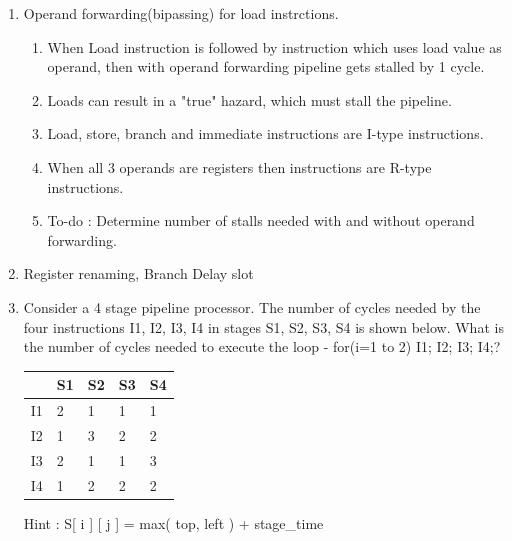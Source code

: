 \begin{enumerate}
    \newpage

    \item Operand forwarding(bipassing) for load instrctions.
    \begin{enumerate}
        \item When Load instruction is followed by instruction which uses load value as operand, then
              with operand forwarding pipeline gets stalled by 1 cycle.
        \item Loads can result in a "true" hazard, which must stall the pipeline.
        \item Load, store, branch and immediate instructions are I-type instructions.
        \item When all 3 operands are registers then instructions are R-type instructions.
        \item To-do : Determine number of stalls needed with and without operand forwarding.
    \end{enumerate}

    \item Register renaming, Branch Delay slot

    \item Consider a 4 stage pipeline processor.   The number of cycles needed by the four
             instructions I1, I2, I3, I4 in stages S1, S2, S3, S4 is shown below. What is the number of cycles needed to execute the loop - for(i=1 to 2) {I1; I2; I3; I4;}?

             \begin{myTableStyle} \begin{tabular}{ |m{1cm}|m{1cm}|m{1cm}|m{1cm}|m{1cm}| } \hline
                   & S1 & S2 & S3 & S4 \\ \hline
                I1 & 2  & 1  & 1  & 1  \\ \hline
                I2 & 1  & 3  & 2  & 2  \\ \hline
                I3 & 2  & 1  & 1  & 3  \\ \hline
                I4 & 1  & 2  & 2  & 2  \\ \hline
              \end{tabular} \end{myTableStyle} \vspace{0.08in}

    Hint : \quad S[ i ] [ j ] = max( top, left ) + stage\_time \\


\end{enumerate}
